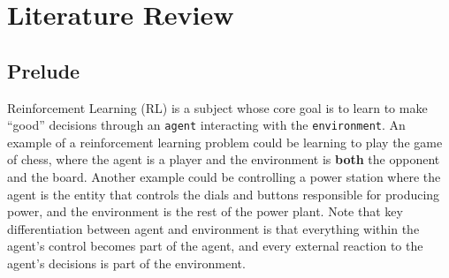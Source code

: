 \documentclass[12pt]{report}
\begin{document}








\chapter{Literature Review}
\section{Prelude}

Reinforcement Learning (RL) is a subject whose core goal is to learn to make ``good'' decisions through an \texttt{agent} interacting with the \texttt{environment}. An example of a reinforcement learning problem could be learning to play the game of chess, where the agent is a player and the environment is \textbf{both} the opponent and the board. Another example could be controlling a power station where the agent is the entity that controls the dials and buttons responsible for producing power, and the environment is the rest of the power plant. Note that key differentiation between agent and environment is that everything within the agent's control becomes part of the agent, and every external reaction to the agent's decisions is part of the environment.\\
\end{document}
